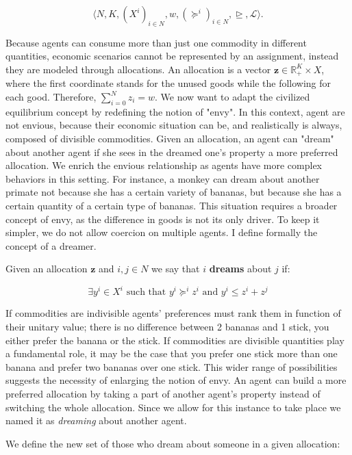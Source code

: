 \[\langle N,K,(X^i)_{i\in N}, w, (\succeq^i)_{i\in N}, \trianglerighteq, \mathcal{L}\rangle.\]

Because agents can consume more than just one commodity in different quantities, economic scenarios cannot be represented by an assignment, instead they are modeled through allocations. An allocation is a vector $\textbf{z}\in \mathbb{R}_+^K\times X$, where the first coordinate stands for the unused goods while the following for each good. Therefore, $\sum_{i=0}^Nz_i=w$. We now want to adapt the civilized equilibrium concept by redefining the notion of "envy". In this context, agent are not envious, because their economic situation can be, and realistically is always, composed of divisible commodities. Given an allocation, an agent can "dream" about another agent if she sees in the dreamed one's property a more preferred allocation. We enrich the envious relationship as agents have more complex behaviors in this setting. For instance, a monkey can dream about another primate not because she has a certain variety of bananas, but because she has a certain quantity of a certain type of bananas. This situation requires a broader concept of envy, as the difference in goods is not its only driver. To keep it simpler, we do not allow coercion on multiple agents. I define formally the concept of a dreamer.

\begin{definition}
    Given an allocation $\textbf{z}$ and $i,j\in N$ we say that $i$ \textbf{dreams} about $j$ if:

\[\exists y^i\in X^i \text{ such that } y^i\succeq^iz^i \text{ and } y^i\leq z^i+z^j\]
\end{definition}

If commodities are indivisible agents' preferences must rank them in function of their unitary value; there is no difference between 2 bananas and 1 stick, you either prefer the banana or the stick. If commodities are divisible quantities play a fundamental role, it may be the case that you prefer one stick more than one banana and prefer two bananas over one stick. This wider range of possibilities suggests the necessity of enlarging the notion of envy. An agent can build a more preferred allocation by taking a part of another agent's property instead of switching the whole allocation. Since we allow for this instance to take place we named it as \textit{dreaming} about another agent.

We define the new set of those who dream about someone in a given allocation:

